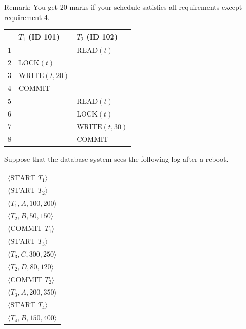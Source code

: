 \noindent Remark: You get 20 marks if your schedule satisfies all requirements except requirement 4.


\begin{sol}

\begin{center}
    \begin{tabular}{c|l|l}
        & \(T_{1}\) (ID 101) & \(T_{2}\) (ID 102) \\
        \hline
        1 & & \(\text{READ}(t)\) \\
        2 & \(\text{LOCK}(t)\) & \\
        3 & \(\text{WRITE}(t, 20)\) & \\
        4 & COMMIT & \\
        5 & & \(\text{READ}(t)\) \\
        6 & & \(\text{LOCK}(t)\) \\
        7 & & \(\text{WRITE}(t, 30)\) \\
        8 & & \(\text{COMMIT}\)
    \end{tabular}
\end{center}

\end{sol}
\pagebreak

 Suppose that the database system sees the following log after a reboot.

\begin{center}
\begin{tabular}{l}
$\langle \text{START } T_{1} \rangle$ \\
$\langle \text{START } T_{2} \rangle$ \\
$\langle T_{1}, A, 100, 200 \rangle$ \\
$\langle T_{2}, B, 50, 150 \rangle$ \\
$\langle \text{COMMIT } T_{1} \rangle$ \\
$\langle \text{START } T_{3} \rangle$ \\
$\langle T_{3}, C, 300, 250 \rangle$ \\
$\langle T_{2}, D, 80, 120 \rangle$ \\
$\langle \text{COMMIT } T_{2} \rangle$ \\
$\langle T_{3}, A, 200, 350 \rangle$ \\
$\langle \text{START } T_{4} \rangle$ \\
$\langle T_{4}, B, 150, 400 \rangle$
\end{tabular}
\end{center}

